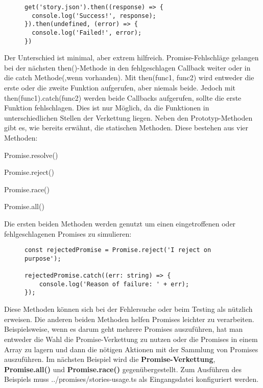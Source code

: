 \begin{figure}[H]
\begin{lstlisting}[basicstyle=\small]
get('story.json').then((response) => {
  console.log('Success!', response);
}).then(undefined, (error) => {
  console.log('Failed!', error);
})
\end{lstlisting}
\end{figure}

\noindent
Der Unterschied ist minimal, aber extrem hilfreich. Promise-Fehlschläge gelangen bei der nächsten then()-Methode in den fehlgeschlagen Callback weiter oder in die catch Methode(,wenn vorhanden). Mit then(func1, func2) wird entweder die erste oder die zweite Funktion aufgerufen, aber niemals beide. Jedoch mit then(func1).catch(func2) werden beide Callbacks aufgerufen, sollte die erste Funktion fehlschlagen. Dies ist nur Möglich, da die Funktionen in unterschiedlichen Stellen der Verkettung liegen. Neben den Prototyp-Methoden gibt es, wie bereits erwähnt, die statischen Methoden. Diese bestehen aus vier Methoden:

\begin{description}
\item Promise.resolve()
\item Promise.reject()
\item Promise.race()
\item Promise.all()
\end{description}

\noindent
Die ersten beiden Methoden werden genutzt um einen eingetroffenen oder fehlgeschlagenen Promises zu simulieren:

\begin{figure}[H]
\begin{lstlisting}[basicstyle=\small]
const rejectedPromise = Promise.reject('I reject on purpose');

rejectedPromise.catch((err: string) => {
    console.log('Reason of failure: ' + err);
});
\end{lstlisting}
\end{figure}

\noindent
Diese Methoden können sich bei der Fehlersuche oder beim Testing als nützlich erweisen. Die anderen beiden Methoden helfen Promises leichter zu verarbeiten. Beispielsweise, wenn es darum geht mehrere Promises auszuführen, hat man entweder die Wahl die Promise-Verkettung zu nutzen oder die Promises in einem Array zu lagern und dann die nötigen Aktionen mit der Sammlung von Promises auszuführen. Im nächsten Beispiel wird die \textbf{Promise-Verkettung}, \textbf{Promise.all()} und \textbf{Promise.race()} gegenübergestellt. Zum Ausführen des Beispiels muss ../promises/stories-usage.ts als Eingangsdatei konfiguriert werden.


